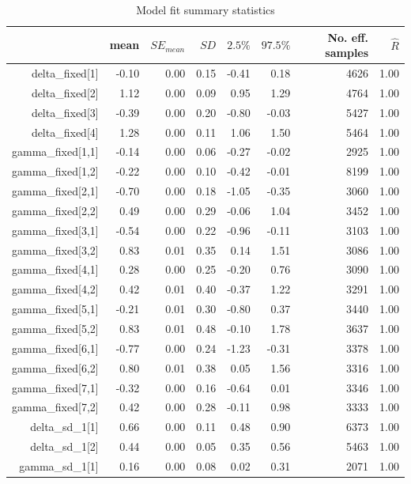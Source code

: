\documentclass[a4paper,man,apacite,floatsintext]{apa6}
\begin{document}
\begin{table}[H]
\caption{Model fit summary statistics}
\begin{tabular}{rrrrrrrr}
  & mean & $SE_{mean}$ & $SD$ & $2.5\%$ & $97.5\%$ & No. eff. samples & $\hat{R}$ \\ 
  \hline
  delta\_fixed[1] & -0.10 & 0.00 & 0.15 & -0.41 & 0.18 & 4626 & 1.00 \\ 
  delta\_fixed[2] & 1.12 & 0.00 & 0.09 & 0.95 & 1.29 & 4764 & 1.00 \\ 
  delta\_fixed[3] & -0.39 & 0.00 & 0.20 & -0.80 & -0.03 & 5427 & 1.00 \\ 
  delta\_fixed[4] & 1.28 & 0.00 & 0.11 & 1.06 & 1.50 & 5464 & 1.00 \\ 
  gamma\_fixed[1,1] & -0.14 & 0.00 & 0.06 & -0.27 & -0.02 & 2925 & 1.00 \\ 
  gamma\_fixed[1,2] & -0.22 & 0.00 & 0.10 & -0.42 & -0.01 & 8199 & 1.00 \\ 
  gamma\_fixed[2,1] & -0.70 & 0.00 & 0.18 & -1.05 & -0.35 & 3060 & 1.00 \\ 
  gamma\_fixed[2,2] & 0.49 & 0.00 & 0.29 & -0.06 & 1.04 & 3452 & 1.00 \\ 
  gamma\_fixed[3,1] & -0.54 & 0.00 & 0.22 & -0.96 & -0.11 & 3103 & 1.00 \\ 
  gamma\_fixed[3,2] & 0.83 & 0.01 & 0.35 & 0.14 & 1.51 & 3086 & 1.00 \\ 
  gamma\_fixed[4,1] & 0.28 & 0.00 & 0.25 & -0.20 & 0.76 & 3090 & 1.00 \\ 
  gamma\_fixed[4,2] & 0.42 & 0.01 & 0.40 & -0.37 & 1.22 & 3291 & 1.00 \\ 
  gamma\_fixed[5,1] & -0.21 & 0.01 & 0.30 & -0.80 & 0.37 & 3440 & 1.00 \\ 
  gamma\_fixed[5,2] & 0.83 & 0.01 & 0.48 & -0.10 & 1.78 & 3637 & 1.00 \\ 
  gamma\_fixed[6,1] & -0.77 & 0.00 & 0.24 & -1.23 & -0.31 & 3378 & 1.00 \\ 
  gamma\_fixed[6,2] & 0.80 & 0.01 & 0.38 & 0.05 & 1.56 & 3316 & 1.00 \\ 
  gamma\_fixed[7,1] & -0.32 & 0.00 & 0.16 & -0.64 & 0.01 & 3346 & 1.00 \\ 
  gamma\_fixed[7,2] & 0.42 & 0.00 & 0.28 & -0.11 & 0.98 & 3333 & 1.00 \\ 
  delta\_sd\_1[1] & 0.66 & 0.00 & 0.11 & 0.48 & 0.90 & 6373 & 1.00 \\ 
  delta\_sd\_1[2] & 0.44 & 0.00 & 0.05 & 0.35 & 0.56 & 5463 & 1.00 \\ 
  gamma\_sd\_1[1] & 0.16 & 0.00 & 0.08 & 0.02 & 0.31 & 2071 & 1.00 \\ 

\end{tabular}
\end{table}
\end{document}
